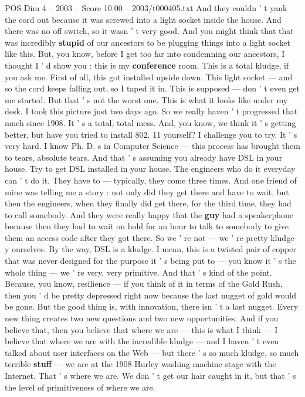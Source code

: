\begin{textsample}{POS Dim 4 – 2003 – Score 10.00 – 2003/t000405.txt}
And they couldn ' t yank the cord out because it was screwed into a light socket inside the house.
And there was no off switch, so it wasn ' t very good.
And you might think that that was incredibly \textbf{stupid} of our ancestors to be plugging things into a light socket like this.
But, you know, before I get too far into condemning our ancestors, I thought I ' d show you : this is my \textbf{conference} room.
This is a total kludge, if you ask me.
First of all, this got installed upside down.
This light socket — and so the cord keeps falling out, so I taped it in.
This is supposed — don ' t even get me started.
But that ' s not the worst one.
This is what it looks like under my desk.
I took this picture just two days ago.
So we really haven ' t progressed that much since 1908.
It ' s a total, total mess.
And, you know, we think it ' s getting better, but have you tried to install 802. 11 yourself?
I challenge you to try.
It ' s very hard.
I know Ph.
D. s in Computer Science — this process has brought them to tears, absolute tears.
And that ' s assuming you already have DSL in your house.
Try to get DSL installed in your house.
The engineers who do it everyday can ' t do it.
They have to — typically, they come three times.
And one friend of mine was telling me a story : not only did they get there and have to wait, but then the engineers, when they finally did get there, for the third time, they had to call somebody.
And they were really happy that the \textbf{guy} had a speakerphone because then they had to wait on hold for an hour to talk to somebody to give them an access code after they got there.
So we ' re not — we ' re pretty kludge-y ourselves.
By the way, DSL is a kludge.
I mean, this is a twisted pair of copper that was never designed for the purpose it ' s being put to — you know it ' s the whole thing — we ' re very, very primitive.
And that ' s kind of the point.
Because, you know, resilience — if you think of it in terms of the Gold Rush, then you ' d be pretty depressed right now because the last nugget of gold would be gone.
But the good thing is, with innovation, there isn ' t a last nugget.
Every new thing creates two new questions and two new opportunities.
And if you believe that, then you believe that where we are — this is what I think — I believe that where we are with the incredible kludge — and I haven ' t even talked about user interfaces on the Web — but there ' s so much kludge, so much terrible \textbf{stuff} — we are at the 1908 Hurley washing machine stage with the Internet.
That ' s where we are.
We don ' t get our hair caught in it, but that ' s the level of primitiveness of where we are.

\end{textsample}
